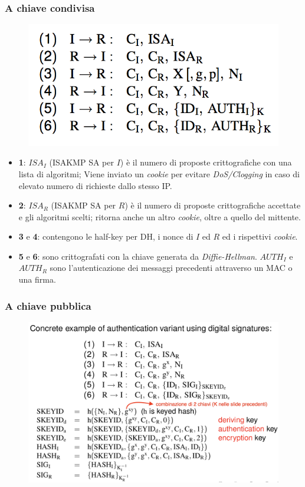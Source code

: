 \documentclass[11pt, a4paper, twoside, italian]{report}
\theoremstyle{plain}
\begin{document}
\begin{multicols}{2}
\subsubsection*{A chiave condivisa}
\begin{figure}[H]
	\centering
	\includegraphics[scale=0.7]{ikefase1mainmodemessaggi}
\end{figure}
\begin{itemize}
	\item \textbf{1}: $ISA_{I}$ (ISAKMP SA per $I$) è il numero di proposte crittografiche con una lista di algoritmi; Viene inviato un \textit{cookie} per evitare \textit{DoS/Clogging} in caso di elevato numero di richieste dallo stesso IP.
	\item \textbf{2}: $ISA_{R}$ (ISAKMP SA per $R$) è il numero di proposte crittografiche accettate e gli algoritmi scelti; ritorna anche un altro \textit{cookie}, oltre a quello del mittente.
	\item \textbf{3} e \textbf{4}: contengono le half-key per DH, i nonce di $I$ ed $R$ ed i rispettivi \textit{cookie}.
	\item \textbf{5} e \textbf{6}: sono crittografati con la chiave generata da \textit{Diffie-Hellman}. $AUTH_{I}$ e $AUTH_{R}$ sono l'autenticazione dei messaggi precedenti attraverso un MAC o una firma.
\end{itemize}
\columnbreak
\subsubsection*{A chiave pubblica}
\begin{figure}[H]
	\centering
	\includegraphics[scale=0.5]{ikefase1mainmodechiavepubblica}
\end{figure}


\end{multicols}
\end{document}
